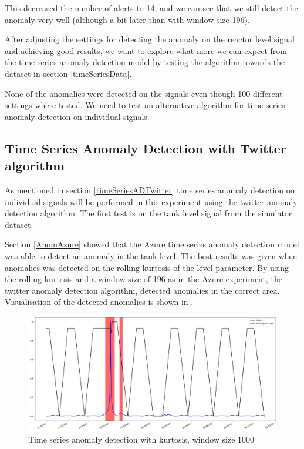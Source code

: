 \documentclass[english, a4paper]{report}
\begin{document}
{{{            This decreased the number of alerts to 14, and we can see that we still detect the anomaly very well (although a bit later than with window size 196).
            \par 
            After adjusting the settings for detecting the anomaly on the reactor level signal and achieving good results, we want to explore what more we can expect from the time series anomaly detection model by testing the algorithm towards the dataset in section \ref{timeSeriesData}.
            \par
            None of the anomalies were detected on the signals even though 100 different settings where tested. We need to test an alternative algorithm for time series anomaly detection on individual signals. 
        }
        
        \subsection{Time Series Anomaly Detection with Twitter algorithm}\label{AnomTwitter}
        {
            As mentioned in section \ref{timeSeriesADTwitter} time series anomaly detection on individual signals will be performed in this experiment using the twitter anomaly detection algorithm. The first test is on the tank level signal from the simulator dataset. 
            \par 
            Section \ref{AnomAzure} showed that the Azure time series anomaly detection model was able to detect an anomaly in the tank level. The best results was given when anomalies was detected on the rolling kurtosis of the level parameter. By using the rolling kurtosis and a window size of 196 as in the Azure experiment, the twitter anomaly detection algorithm, detected anomalies in the correct area. Visualisation of the detected anomalies is shown in .
            
            \begin{figure}[H]
                \centering
                \includegraphics[width=\textwidth]{AnomSimuTwitt}
                \caption{Time series anomaly detection with kurtosis, window size 1000}
                \label{fig:AnomSimuTwitt}
            \end{figure}
            
}}}
\end{document}

